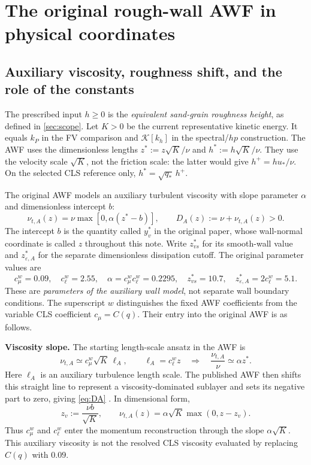 \documentclass[11pt,a4paper]{article}
\numberwithin{equation}{section}
\newcommand{\eps}{\varepsilon}
\newcommand{\ust}{u_*}
\newcommand{\qs}{q_*}
\begin{document}
\section{The original rough-wall AWF in physical coordinates}
\label{sec:awf}
\subsection{Auxiliary viscosity, roughness shift, and the role of the constants}
The prescribed input $h\geq0$ is the \emph{equivalent sand-grain roughness
height}, as defined in \cref{sec:scope}. Let $K>0$ be the current
representative kinetic energy. It equals $k_P$ in the FV comparison and
$\mathcal K[k_h]$ in the spectral/$hp$ construction. The AWF uses the dimensionless
lengths $z^*:=z\sqrt K/\nu$ and $h^*:=h\sqrt K/\nu$. They use the velocity
scale $\sqrt K$, not the friction scale: the latter would give
$h^+=h\ust/\nu$. On the selected CLS reference only,
$h^*=\sqrt{\qs}\,h^+$.

The original AWF models an auxiliary turbulent viscosity with slope
parameter $\alpha$ and dimensionless intercept $b$:
\begin{equation}
 \boxed{\nu_{t,A}(z)=\nu\max[0,\alpha(z^*-b)],\qquad
 D_A(z):=\nu+\nu_{t,A}(z)>0.}
 \label{eq:DA}
\end{equation}
The intercept $b$ is the quantity called $y_v^*$ in the original paper,
whose wall-normal coordinate is called $z$ throughout this note. Write
$z_{vs}^*$ for its smooth-wall value and $z_{\eps,A}^*$ for the separate
dimensionless dissipation cutoff. The original parameter values are
\cite[Table~1]{SCI2006}
\begin{equation}
 c_\mu^w=0.09,\quad c_\ell^w=2.55,\quad
 \alpha=c_\mu^wc_\ell^w=0.2295,\quad
 z_{vs}^*=10.7,\quad z_{\eps,A}^*=2c_\ell^w=5.1.
 \label{eq:AWFconstants}
\end{equation}
These are \emph{parameters of the auxiliary wall model}, not separate
wall boundary conditions. The superscript $w$ distinguishes the fixed
AWF coefficients from the variable CLS coefficient $c_\mu=C(q)$.
Their entry into the original AWF is as follows.

\textbf{Viscosity slope.}
The starting length-scale ansatz in the AWF is
\cite[Eq.~(5)]{SCI2006}
\begin{equation}
 \nu_{t,A}\simeq c_\mu^w\sqrt K\,\ell_A,
 \qquad \ell_A=c_\ell^w z
 \quad\Longrightarrow\quad
 \frac{\nu_{t,A}}{\nu}\simeq\alpha z^*.
 \label{eq:awf_length_ansatz}
\end{equation}
Here $\ell_A$ is an auxiliary turbulence length scale. The published AWF
then shifts this straight line to represent a viscosity-dominated
sublayer and sets its negative part to zero, giving \cref{eq:DA}
\cite[Eq.~(6)]{SCI2006}. In dimensional form,
\begin{equation}
 z_v:=\frac{\nu b}{\sqrt K},\qquad
 \nu_{t,A}(z)=\alpha\sqrt K\max(0,z-z_v).
 \label{eq:awf_dimensional_viscosity}
\end{equation}
Thus $c_\mu^w$ and $c_\ell^w$ enter the momentum reconstruction through
the slope $\alpha\sqrt K$. This auxiliary viscosity is not the resolved
CLS viscosity evaluated by replacing $C(q)$ with $0.09$.
\end{document}
